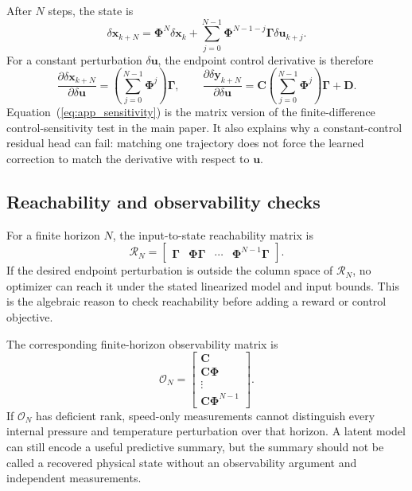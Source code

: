 \documentclass[10pt,journal]{IEEEtran}
\begin{document}
After $N$ steps, the state is
\begin{equation}
  \delta\mathbf{x}_{k+N}
  =\boldsymbol{\Phi}^{N}\delta\mathbf{x}_k
  +\sum_{j=0}^{N-1}\boldsymbol{\Phi}^{N-1-j}\boldsymbol{\Gamma}\delta\mathbf{u}_{k+j}.
  \label{eq:app_multistep}
\end{equation}
For a constant perturbation $\delta\mathbf{u}$, the endpoint control derivative is therefore
\begin{equation}
  \frac{\partial\delta\mathbf{x}_{k+N}}{\partial\delta\mathbf{u}}
  =\left(\sum_{j=0}^{N-1}\boldsymbol{\Phi}^{j}\right)\boldsymbol{\Gamma},
  \qquad
  \frac{\partial\delta\mathbf{y}_{k+N}}{\partial\delta\mathbf{u}}
  =\mathbf{C}\left(\sum_{j=0}^{N-1}\boldsymbol{\Phi}^{j}\right)\boldsymbol{\Gamma}+\mathbf{D}.
  \label{eq:app_sensitivity}
\end{equation}
Equation~(\ref{eq:app_sensitivity}) is the matrix version of the finite-difference control-sensitivity test in the main paper. It also explains why a constant-control residual head can fail: matching one trajectory does not force the learned correction to match the derivative with respect to $\mathbf{u}$.

\subsection{Reachability and observability checks}
For a finite horizon $N$, the input-to-state reachability matrix is
\begin{equation}
  \mathcal{R}_N=\begin{bmatrix}
  \boldsymbol{\Gamma}&\boldsymbol{\Phi}\boldsymbol{\Gamma}&\cdots&\boldsymbol{\Phi}^{N-1}\boldsymbol{\Gamma}
  \end{bmatrix}.
  \label{eq:app_reachability}
\end{equation}
If the desired endpoint perturbation is outside the column space of $\mathcal{R}_N$, no optimizer can reach it under the stated linearized model and input bounds. This is the algebraic reason to check reachability before adding a reward or control objective.

The corresponding finite-horizon observability matrix is
\begin{equation}
  \mathcal{O}_N=\begin{bmatrix}
  \mathbf{C}\\
  \mathbf{C}\boldsymbol{\Phi}\\
  \vdots\\
  \mathbf{C}\boldsymbol{\Phi}^{N-1}
  \end{bmatrix}.
  \label{eq:app_observability}
\end{equation}
If $\mathcal{O}_N$ has deficient rank, speed-only measurements cannot distinguish every internal pressure and temperature perturbation over that horizon. A latent model can still encode a useful predictive summary, but the summary should not be called a recovered physical state without an observability argument and independent measurements.
\end{document}
